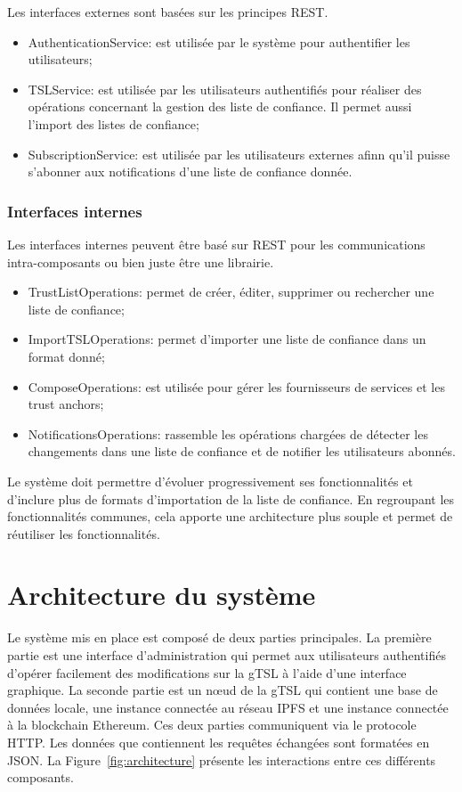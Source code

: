 \documentclass{tnreport}
\begin{document}
Les interfaces externes sont basées sur les principes REST.

\begin{itemize}
	\item AuthenticationService: est utilisée par le système pour authentifier les utilisateurs;
	\item TSLService: est utilisée par les utilisateurs authentifiés pour réaliser des opérations concernant la gestion des liste de confiance. Il permet aussi l'import des listes de confiance;
	\item SubscriptionService: est utilisée par les utilisateurs externes afinn qu'il puisse s'abonner aux notifications d'une liste de confiance donnée.
\end{itemize}

\subsubsection{Interfaces internes}

Les interfaces internes peuvent être basé sur REST pour les communications intra-composants ou bien juste être une librairie.

\begin{itemize}
	\item TrustListOperations: permet de créer, éditer, supprimer ou rechercher une liste de confiance;
	\item ImportTSLOperations: permet d'importer une liste de confiance dans un format donné;
	\item ComposeOperations: est utilisée pour gérer les fournisseurs de services et les trust anchors;
	\item NotificationsOperations: rassemble les opérations chargées de détecter les changements dans une liste de confiance et de notifier les utilisateurs abonnés.
\end{itemize}

Le système doit permettre d'évoluer progressivement ses fonctionnalités et d'inclure plus de formats d'importation de la liste de confiance. En regroupant les fonctionnalités communes, cela apporte une architecture plus souple et permet de réutiliser les fonctionnalités.

\section{Architecture du système}
\label{sec:architecture}

Le système mis en place est composé de deux parties principales. La première partie est une interface d'administration qui permet aux utilisateurs authentifiés d'opérer facilement des modifications sur la gTSL à l'aide d'une interface graphique. La seconde partie est un nœud de la gTSL qui contient une base de données locale, une instance connectée au réseau IPFS et une instance connectée à la blockchain Ethereum. Ces deux parties communiquent via le protocole HTTP. Les données que contiennent les requêtes échangées sont formatées en JSON. La Figure~\ref{fig:architecture} présente les interactions entre ces différents composants.
\end{document}
